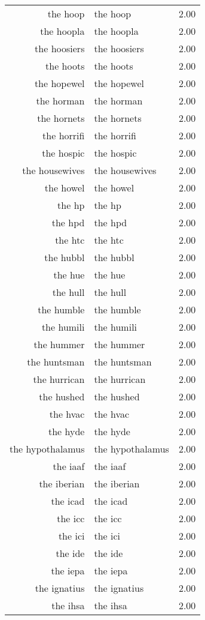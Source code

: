 \begin{table}[ht]
\begin{tabular}{rlr}
  the hoop & the hoop & 2.00 \\ 
  the hoopla & the hoopla & 2.00 \\ 
  the hoosiers & the hoosiers & 2.00 \\ 
  the hoots & the hoots & 2.00 \\ 
  the hopewel & the hopewel & 2.00 \\ 
  the horman & the horman & 2.00 \\ 
  the hornets & the hornets & 2.00 \\ 
  the horrifi & the horrifi & 2.00 \\ 
  the hospic & the hospic & 2.00 \\ 
  the housewives & the housewives & 2.00 \\ 
  the howel & the howel & 2.00 \\ 
  the hp & the hp & 2.00 \\ 
  the hpd & the hpd & 2.00 \\ 
  the htc & the htc & 2.00 \\ 
  the hubbl & the hubbl & 2.00 \\ 
  the hue & the hue & 2.00 \\ 
  the hull & the hull & 2.00 \\ 
  the humble & the humble & 2.00 \\ 
  the humili & the humili & 2.00 \\ 
  the hummer & the hummer & 2.00 \\ 
  the huntsman & the huntsman & 2.00 \\ 
  the hurrican & the hurrican & 2.00 \\ 
  the hushed & the hushed & 2.00 \\ 
  the hvac & the hvac & 2.00 \\ 
  the hyde & the hyde & 2.00 \\ 
  the hypothalamus & the hypothalamus & 2.00 \\ 
  the iaaf & the iaaf & 2.00 \\ 
  the iberian & the iberian & 2.00 \\ 
  the icad & the icad & 2.00 \\ 
  the icc & the icc & 2.00 \\ 
  the ici & the ici & 2.00 \\ 
  the ide & the ide & 2.00 \\ 
  the iepa & the iepa & 2.00 \\ 
  the ignatius & the ignatius & 2.00 \\ 
  the ihsa & the ihsa & 2.00 \\ 

\end{tabular}
\end{table}
